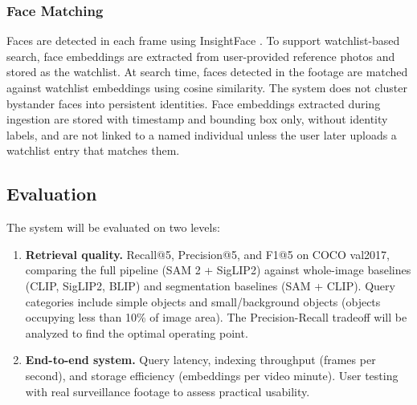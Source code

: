 \subsubsection{Face Matching}

Faces are detected in each frame using InsightFace \cite{deng2019arcface}. To support watchlist-based search, face embeddings are extracted from user-provided reference photos and stored as the watchlist. At search time, faces detected in the footage are matched against watchlist embeddings using cosine similarity. The system does not cluster bystander faces into persistent identities. Face embeddings extracted during ingestion are stored with timestamp and bounding box only, without identity labels, and are not linked to a named individual unless the user later uploads a watchlist entry that matches them.

\subsection{Evaluation}

The system will be evaluated on two levels:

\begin{enumerate}
    \item \textbf{Retrieval quality.} Recall@5, Precision@5, and F1@5 on COCO val2017, comparing the full pipeline (SAM 2 + SigLIP2) against whole-image baselines (CLIP, SigLIP2, BLIP) and segmentation baselines (SAM + CLIP). Query categories include simple objects and small/background objects (objects occupying less than 10\% of image area). The Precision-Recall tradeoff will be analyzed to find the optimal operating point.
    \item \textbf{End-to-end system.} Query latency, indexing throughput (frames per second), and storage efficiency (embeddings per video minute). User testing with real surveillance footage to assess practical usability.
\end{enumerate}
